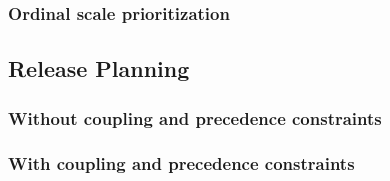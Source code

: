 \documentclass[11pt]{article}
\begin{document}
\subsubsection{Ordinal scale prioritization}
\blindtext


\clearpage\newpage 

\subsection{Release Planning}
\blindtext
\subsubsection{Without coupling and precedence constraints}
\blindtext
\subsubsection{With coupling and precedence constraints}
\blindtext
\end{document}
